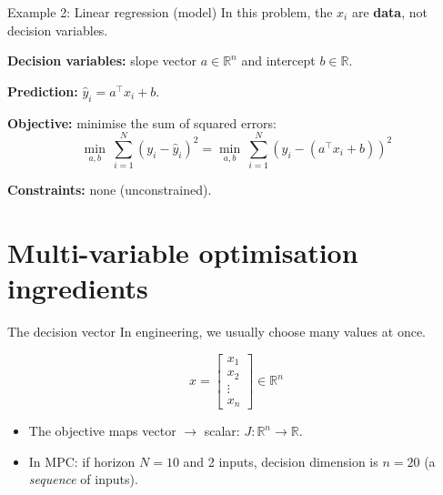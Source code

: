 \documentclass[aspectratio=169,10pt]{beamer}
\newcommand{\R}{\mathbb{R}}
\begin{document}
\begin{frame}{Example 2: Linear regression (model)}
In this problem, the $x_i$ are \textbf{data}, not decision variables.

\textbf{Decision variables:} slope vector $a\in \R^n$ and intercept $b\in \R$.

\textbf{Prediction:} $\hat{y}_i=a^\top x_i + b$.

\textbf{Objective:} minimise the sum of squared errors:
\begin{equation*}
\min_{a,b}\ \sum_{i=1}^N (y_i-\hat{y}_i)^2
=\min_{a,b}\ \sum_{i=1}^N \left(y_i-(a^\top x_i+b)\right)^2
\end{equation*}

\textbf{Constraints:} none (unconstrained).
\end{frame}

\section{Multi-variable optimisation ingredients}

\begin{frame}{The decision vector}
In engineering, we usually choose many values at once.

\begin{equation*}
x=\begin{bmatrix}x_1\\x_2\\\vdots\\x_n\end{bmatrix}\in\R^n
\end{equation*}

\begin{itemize}
  \item The objective maps vector $\rightarrow$ scalar: $J:\R^n\to \R$.
  \item In MPC: if horizon $N=10$ and 2 inputs, decision dimension is $n=20$ (a \emph{sequence} of inputs).
\end{itemize}
\end{frame}
\end{document}
